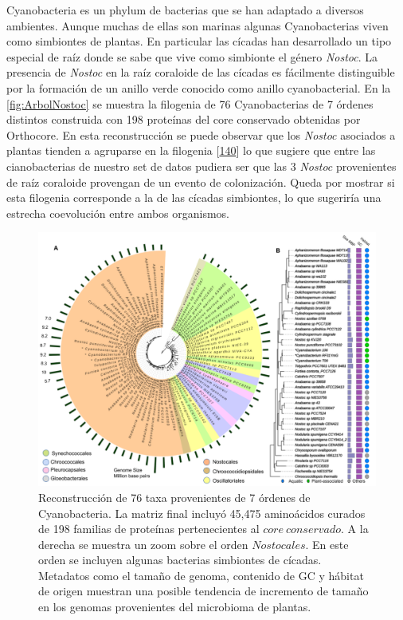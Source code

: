 \documentclass[12pt,twoside]{reedthesis}
\begin{document}
  Cyanobacteria es un phylum de bacterias que se han adaptado a diversos
  ambientes. Aunque muchas de ellas son marinas algunas Cyanobacterias
  viven como simbiontes de plantas. En particular las cícadas han
  desarrollado un tipo especial de raíz donde se sabe que vive como
  simbionte el género \emph{Nostoc}. La presencia de \emph{Nostoc} en la
  raíz coraloide de las cícadas es fácilmente distinguible por la
  formación de un anillo verde conocido como anillo cyanobacterial. En la
  \autoref{fig:ArbolNostoc} se muestra la filogenia de 76 Cyanobacterias
  de 7 órdenes distintos construida con 198 proteínas del core conservado
  obtenidas por Orthocore. En esta reconstrucción se puede observar que
  los \emph{Nostoc} asociados a plantas tienden a agruparse en la
  filogenia {[}\protect\hyperlink{ref-gutierrez-garcia_cycad_2019}{140}{]}
  lo que sugiere que entre las cianobacterias de nuestro set de datos
  pudiera ser que las 3 \emph{Nostoc} provenientes de raíz coraloide
  provengan de un evento de colonización. Queda por mostrar si esta
  filogenia corresponde a la de las cícadas simbiontes, lo que sugeriría
  una estrecha coevolución entre ambos organismos.
  
  \begin{figure}[h!tbp]
  \centering
  \includegraphics[angle = 0,scale = .45]{chapter1/Nostoc.png}
  \caption[Arbol filogenético de $Nostoc$ construido utilizando  la selección de genes del $core~conservado$]{\footnotesize{Reconstrucción de 76 taxa provenientes de 7 órdenes de Cyanobacteria. La matriz final incluyó 45,475 aminoácidos curados de 198 familias de proteínas pertenecientes al $core~conservado$. A la derecha se muestra un zoom sobre el orden $Nostocales$. En este orden se incluyen algunas bacterias simbiontes de cícadas. Metadatos como el tamaño de genoma, contenido de GC y hábitat de origen muestran una posible tendencia de incremento de tamaño en los genomas provenientes del microbioma de plantas.}}
  \label{fig:ArbolNostoc}
  \end{figure}
  
\end{document}
